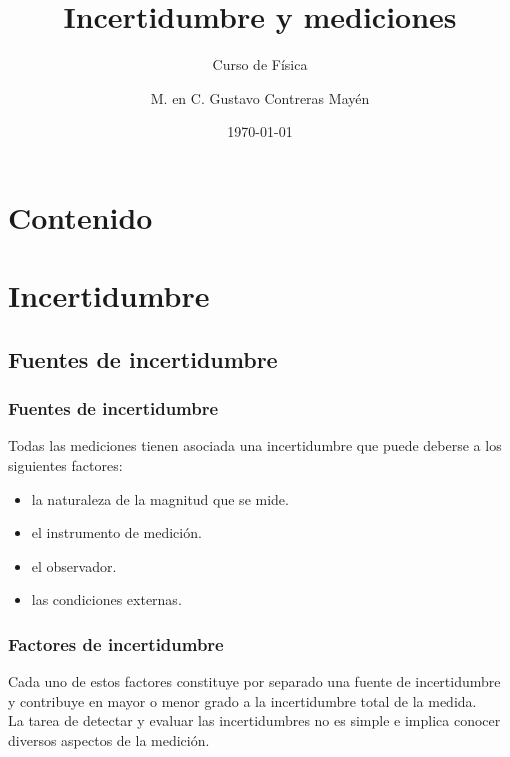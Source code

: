 

%

\title{\large{Incertidumbre y mediciones}}
\subtitle{Curso de Física}
\author[]{M. en C. Gustavo Contreras Mayén}
\date{\today}

\maketitle
\section*{Contenido}
\fontsize{14}{14}\selectfont
{}
\section{Incertidumbre}
\subsection{Fuentes de incertidumbre}
\begin{frame}
\frametitle{Fuentes de incertidumbre}
Todas las mediciones tienen asociada una incertidumbre que puede deberse a los siguientes factores:
\begin{itemize}[<+->]
\item[\checkmark] la naturaleza de la magnitud que se mide.
\item[\checkmark] el instrumento de medición.
\item[\checkmark] el observador.
\item[\checkmark] las condiciones externas.
\end{itemize}
\end{frame}
\begin{frame}
\frametitle{Factores de incertidumbre}
Cada uno de estos factores constituye por separado una fuente de incertidumbre y contribuye en mayor o menor grado a la incertidumbre total de la medida.
\\
\bigskip
\pause
La tarea de detectar y evaluar las incertidumbres no es simple e implica conocer diversos aspectos de la medición.
\end{frame}
